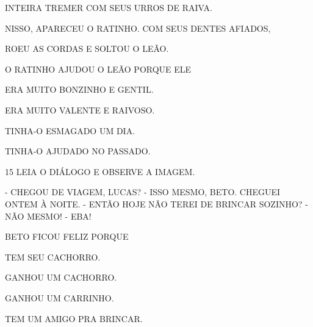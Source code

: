 INTEIRA TREMER COM SEUS URROS DE RAIVA.

NISSO, APARECEU O RATINHO. COM SEUS DENTES AFIADOS,

ROEU AS CORDAS E SOLTOU O LEÃO.


O RATINHO AJUDOU O LEÃO PORQUE ELE

\begin{escolha}
\item ERA MUITO BONZINHO E GENTIL.

\item ERA MUITO VALENTE E RAIVOSO.

\item TINHA-O ESMAGADO UM DIA.

\item TINHA-O AJUDADO NO PASSADO.
\end{escolha}


\num{15} LEIA O DIÁLOGO E OBSERVE A IMAGEM.



- CHEGOU DE VIAGEM, LUCAS?
- ISSO MESMO, BETO. CHEGUEI ONTEM À NOITE.
- ENTÃO HOJE NÃO TEREI DE BRINCAR SOZINHO?
- NÃO MESMO!
- EBA!

BETO FICOU FELIZ PORQUE

\begin{escolha}
\item TEM SEU CACHORRO.

\item GANHOU UM CACHORRO.

\item GANHOU UM CARRINHO.

\item TEM UM AMIGO PRA BRINCAR.
\end{escolha}



